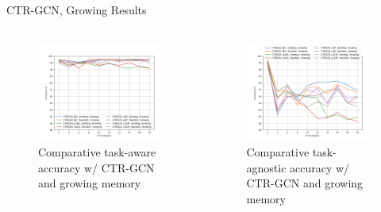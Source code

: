 \documentclass[aspectratio=169, xcolor=dvipsnames]{beamer}
\begin{document}
\begin{frame}{CTR-GCN, Growing Results}
      \framesubtitle{}%
      
      \begin{columns}
      \begin{figure}[ht!]
            \centering
            \includegraphics[width=\textwidth]{images/ctrgcn_growing_TAw_Acc.png}
            \caption{Comparative task-aware accuracy w/ CTR-GCN  and growing memory}
      \end{figure}
      
      \begin{figure}[ht!]
            \centering
            \includegraphics[width=\textwidth]{images/ctrgcn_growing_TAg_Acc.png}
            \caption{Comparative task-agnostic accuracy w/ CTR-GCN  and growing memory}
      \end{figure} 
      \end{columns}
\end{frame}
\end{document}
